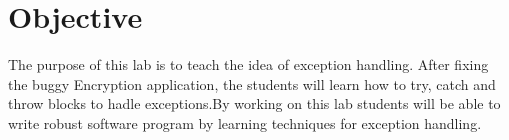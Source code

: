 \section{Objective}

The purpose of this lab is to teach the idea of exception handling. After fixing the buggy Encryption application, the students will learn how to try, catch and throw blocks to hadle exceptions.By working on this lab students will be able to write robust software program by learning techniques for  exception handling.
